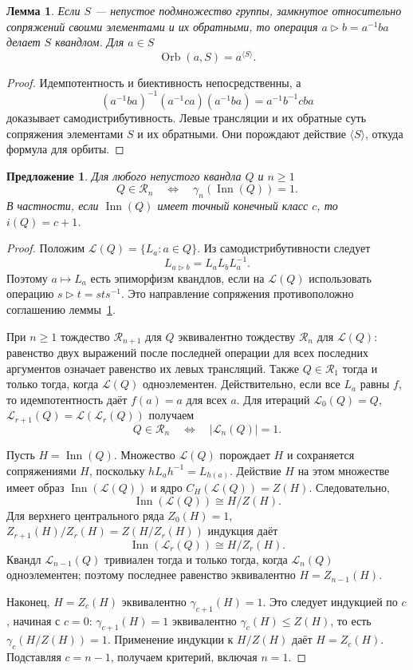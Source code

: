 \documentclass[11pt,a4paper]{article}
\newtheorem{lemma}[theorem]{Лемма}
\newtheorem{proposition}[theorem]{Предложение}
\theoremstyle{definition}
\theoremstyle{remark}
\newcommand{\R}{\mathcal R}
\newcommand{\Inn}{\operatorname{Inn}}
\newcommand{\Orb}{\operatorname{Orb}}
\newcommand{\conj}{\triangleright}
\begin{document}
\begin{lemma}\label{lem:orbits}
Если \(S\) --- непустое подмножество группы, замкнутое относительно
сопряжений своими элементами и их обратными, то операция
\(a\conj b=a^{-1}ba\) делает \(S\) квандлом. Для \(a\in S\)
\[
 \Orb(a,S)=a^{\langle S\rangle}.
\]
\end{lemma}
\begin{proof}
Идемпотентность и биективность непосредственны, а
\[
 (a^{-1}ba)^{-1}(a^{-1}ca)(a^{-1}ba)=a^{-1}b^{-1}cba
\]
доказывает самодистрибутивность.
Левые трансляции и их обратные суть сопряжения элементами
\(S\) и их обратными. Они порождают действие \(\langle S\rangle\),
откуда формула для орбиты.
\end{proof}

\begin{proposition}\label{prop:criterion}
Для любого непустого квандла \(Q\) и \(n\ge1\)
\[
 Q\in\R_n\quad\Longleftrightarrow\quad
 \gamma_n(\Inn(Q))=1.
\]
В частности, если \(\Inn(Q)\) имеет точный конечный класс \(c\),
то \(i(Q)=c+1\).
\end{proposition}
\begin{proof}
Положим \(\mathcal L(Q)=\{L_a:a\in Q\}\).
Из самодистрибутивности следует
\[
 L_{a\conj b}=L_aL_bL_a^{-1}.
\]
Поэтому \(a\mapsto L_a\) есть эпиморфизм квандлов,
если на \(\mathcal L(Q)\) использовать операцию \(s\conj t=sts^{-1}\).
Это направление сопряжения противоположно соглашению
леммы~\ref{lem:orbits}.

При \(n\ge1\) тождество \(\R_{n+1}\) для \(Q\)
эквивалентно тождеству \(\R_n\) для \(\mathcal L(Q)\):
равенство двух выражений после последней операции
для всех последних аргументов означает равенство их левых трансляций.
Также \(Q\in\R_1\) тогда и только тогда, когда
\(\mathcal L(Q)\) одноэлементен.
Действительно, если все \(L_a\) равны \(f\), то
идемпотентность даёт \(f(a)=a\) для всех \(a\).
Для итераций \(\mathcal L_0(Q)=Q\),
\(\mathcal L_{r+1}(Q)=\mathcal L(\mathcal L_r(Q))\) получаем
\[
 Q\in\R_n\quad\Longleftrightarrow\quad
 |\mathcal L_n(Q)|=1.
\]

Пусть \(H=\Inn(Q)\). Множество \(\mathcal L(Q)\) порождает \(H\)
и сохраняется сопряжениями \(H\), поскольку
\(hL_ah^{-1}=L_{h(a)}\).
Действие \(H\) на этом множестве имеет образ
\(\Inn(\mathcal L(Q))\) и ядро
\(C_H(\mathcal L(Q))=Z(H)\).
Следовательно,
\[
 \Inn(\mathcal L(Q))\cong H/Z(H).
\]
Для верхнего центрального ряда \(Z_0(H)=1\),
\(Z_{r+1}(H)/Z_r(H)=Z(H/Z_r(H))\)
индукция даёт
\[
 \Inn(\mathcal L_r(Q))\cong H/Z_r(H).
\]
Квандл \(\mathcal L_{n-1}(Q)\) тривиален тогда и только тогда,
когда \(\mathcal L_n(Q)\) одноэлементен; поэтому
последнее равенство эквивалентно \(H=Z_{n-1}(H)\).

Наконец, \(H=Z_c(H)\) эквивалентно \(\gamma_{c+1}(H)=1\).
Это следует индукцией по \(c\), начиная с \(c=0\):
\(\gamma_{c+1}(H)=1\) эквивалентно
\(\gamma_c(H)\le Z(H)\), то есть
\(\gamma_c(H/Z(H))=1\).
Применение индукции к \(H/Z(H)\) даёт \(H=Z_c(H)\).
Подставляя \(c=n-1\), получаем критерий, включая \(n=1\).
\end{proof}
\end{document}
